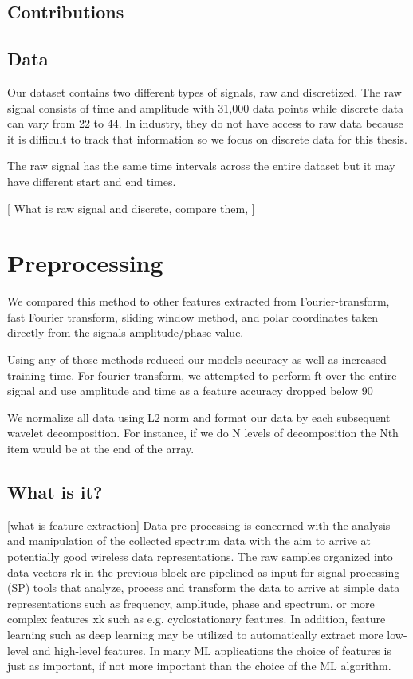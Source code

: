\documentclass{turabian-thesis}
\begin{document}
\section{Contributions}
\section{Data}
Our dataset contains two different types of signals, raw and discretized. The raw signal consists of time and amplitude with 31,000 data points while discrete data can vary from 22 to 44. In industry, they do not have access to raw data because it is difficult to track that information so we focus on discrete data for this thesis.

The raw signal has the same time intervals across the entire dataset but it may have different start and end times. 


[ What is raw signal and discrete, compare them, ]

\chapter{Preprocessing}
We compared this method to other features extracted from Fourier-transform, fast Fourier transform, sliding window method, and polar coordinates taken directly from the signals amplitude/phase value. 

Using any of those methods reduced our models accuracy as well as increased training time. For fourier transform, we attempted to perform ft over the entire signal and use amplitude and time as a feature accuracy dropped below 90%

We normalize all data using L2 norm and format our data by each subsequent wavelet decomposition. For instance, if we do N levels of decomposition the Nth item would be at the end of the array.



\section{What is it?}
[what is feature extraction]
Data pre-processing is concerned with the analysis and manipulation of the collected spectrum data with the aim to arrive at potentially good wireless data representations. The raw samples organized into data vectors rk in the previous block are pipelined as input for signal processing (SP) tools that analyze, process and transform the
data to arrive at simple data representations such as frequency,
amplitude, phase and spectrum, or more complex features
xk such as e.g. cyclostationary features. In addition, feature
learning such as deep learning may be utilized to automatically
extract more low-level and high-level features. In many ML
applications the choice of features is just as important, if not
more important than the choice of the ML algorithm.
\end{document}
